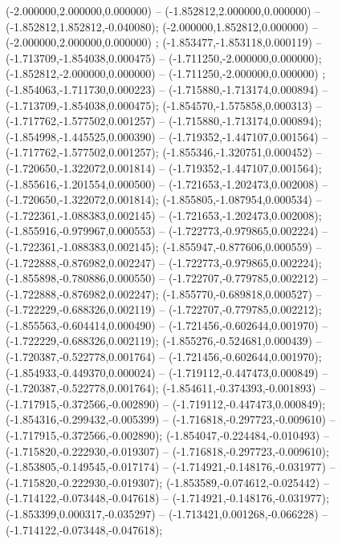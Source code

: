  (-2.000000,2.000000,0.000000) -- (-1.852812,2.000000,0.000000) -- (-1.852812,1.852812,-0.040080);
 (-2.000000,1.852812,0.000000) -- (-2.000000,2.000000,0.000000) ;
 (-1.853477,-1.853118,0.000119) -- (-1.713709,-1.854038,0.000475) -- (-1.711250,-2.000000,0.000000);
 (-1.852812,-2.000000,0.000000) -- (-1.711250,-2.000000,0.000000) ;
 (-1.854063,-1.711730,0.000223) -- (-1.715880,-1.713174,0.000894) -- (-1.713709,-1.854038,0.000475);
 (-1.854570,-1.575858,0.000313) -- (-1.717762,-1.577502,0.001257) -- (-1.715880,-1.713174,0.000894);
 (-1.854998,-1.445525,0.000390) -- (-1.719352,-1.447107,0.001564) -- (-1.717762,-1.577502,0.001257);
 (-1.855346,-1.320751,0.000452) -- (-1.720650,-1.322072,0.001814) -- (-1.719352,-1.447107,0.001564);
 (-1.855616,-1.201554,0.000500) -- (-1.721653,-1.202473,0.002008) -- (-1.720650,-1.322072,0.001814);
 (-1.855805,-1.087954,0.000534) -- (-1.722361,-1.088383,0.002145) -- (-1.721653,-1.202473,0.002008);
 (-1.855916,-0.979967,0.000553) -- (-1.722773,-0.979865,0.002224) -- (-1.722361,-1.088383,0.002145);
 (-1.855947,-0.877606,0.000559) -- (-1.722888,-0.876982,0.002247) -- (-1.722773,-0.979865,0.002224);
 (-1.855898,-0.780886,0.000550) -- (-1.722707,-0.779785,0.002212) -- (-1.722888,-0.876982,0.002247);
 (-1.855770,-0.689818,0.000527) -- (-1.722229,-0.688326,0.002119) -- (-1.722707,-0.779785,0.002212);
 (-1.855563,-0.604414,0.000490) -- (-1.721456,-0.602644,0.001970) -- (-1.722229,-0.688326,0.002119);
 (-1.855276,-0.524681,0.000439) -- (-1.720387,-0.522778,0.001764) -- (-1.721456,-0.602644,0.001970);
 (-1.854933,-0.449370,0.000024) -- (-1.719112,-0.447473,0.000849) -- (-1.720387,-0.522778,0.001764);
 (-1.854611,-0.374393,-0.001893) -- (-1.717915,-0.372566,-0.002890) -- (-1.719112,-0.447473,0.000849);
 (-1.854316,-0.299432,-0.005399) -- (-1.716818,-0.297723,-0.009610) -- (-1.717915,-0.372566,-0.002890);
 (-1.854047,-0.224484,-0.010493) -- (-1.715820,-0.222930,-0.019307) -- (-1.716818,-0.297723,-0.009610);
 (-1.853805,-0.149545,-0.017174) -- (-1.714921,-0.148176,-0.031977) -- (-1.715820,-0.222930,-0.019307);
 (-1.853589,-0.074612,-0.025442) -- (-1.714122,-0.073448,-0.047618) -- (-1.714921,-0.148176,-0.031977);
 (-1.853399,0.000317,-0.035297) -- (-1.713421,0.001268,-0.066228) -- (-1.714122,-0.073448,-0.047618);
